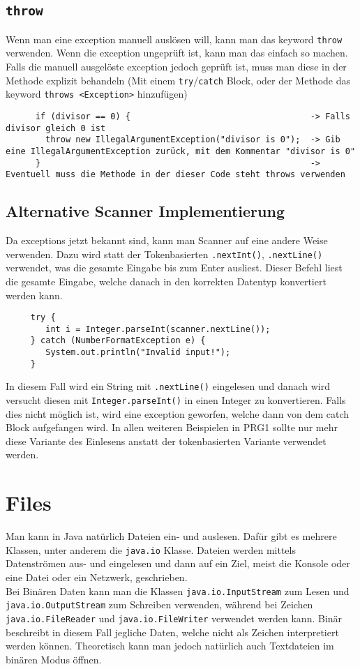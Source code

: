 \documentclass{article}
\begin{document}
	 \subsection{\texorpdfstring{\texttt{throw}}{throw}} 
	 Wenn man eine exception manuell auslösen will, kann man das keyword \verb|throw| verwenden. Wenn die exception ungeprüft ist, kann man das einfach so machen. Falls die manuell ausgelöste exception jedoch geprüft ist, muss man diese in der Methode explizit behandeln (Mit einem \verb|try|/\verb|catch| Block, oder der Methode das keyword \verb|throws <Exception>| hinzufügen)
	 \begin{verbatim}
	  if (divisor == 0) {                                    -> Falls divisor gleich 0 ist
	  	throw new IllegalArgumentException("divisor is 0");  -> Gib eine IllegalArgumentException zurück, mit dem Kommentar "divisor is 0"
	  }                                                      -> Eventuell muss die Methode in der dieser Code steht throws verwenden
	 \end{verbatim}
	 \subsection{Alternative Scanner Implementierung}
	 Da exceptions jetzt bekannt sind, kann man Scanner auf eine andere Weise verwenden. Dazu wird statt der Tokenbasierten \verb|.nextInt()|, \verb|.nextLine()| verwendet, was die gesamte Eingabe bis zum Enter ausliest. Dieser Befehl liest die gesamte Eingabe, welche danach in den korrekten Datentyp konvertiert werden kann.
	 \begin{verbatim}
	 try {
	 	int i = Integer.parseInt(scanner.nextLine());
	 } catch (NumberFormatException e) {
	 	System.out.println("Invalid input!");
	 }
	 \end{verbatim}
	 In diesem Fall wird ein String mit \verb|.nextLine()| eingelesen und danach wird versucht diesen mit \verb|Integer.parseInt()| in einen Integer zu konvertieren. Falls dies nicht möglich ist, wird eine exception geworfen, welche dann von dem catch Block aufgefangen wird. In allen weiteren Beispielen in PRG1 sollte nur mehr diese Variante des Einlesens anstatt der tokenbasierten Variante verwendet werden.
	 \section{Files}
	 Man kann in Java natürlich Dateien ein- und auslesen. Dafür gibt es mehrere Klassen, unter anderem die \verb|java.io| Klasse. Dateien werden mittels Datenströmen aus- und eingelesen und dann auf ein Ziel, meist die Konsole oder eine Datei oder ein Netzwerk, geschrieben. \\
	 Bei Binären Daten kann man die Klassen \verb|java.io.InputStream| zum Lesen und \verb|java.io.OutputStream| zum Schreiben verwenden, während bei Zeichen \verb|java.io.FileReader| und \verb|java.io.FileWriter| verwendet werden kann. Binär beschreibt in diesem Fall jegliche Daten, welche nicht als Zeichen interpretiert werden können. Theoretisch kann man jedoch natürlich auch Textdateien im binären Modus öffnen.
\end{document}
